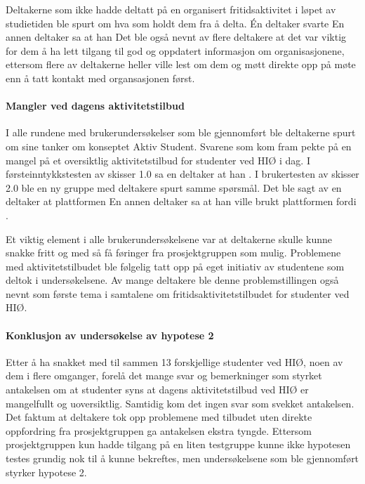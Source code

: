 Deltakerne som ikke hadde deltatt på en organisert fritidsaktivitet i løpet av studietiden ble spurt om hva som holdt dem fra å delta. Én deltaker svarte  En annen deltaker sa at han  Det ble også nevnt av flere deltakere at det var viktig for dem å ha lett tilgang til god og oppdatert informasjon om organisasjonene, ettersom flere av deltakerne heller ville lest om dem og møtt direkte opp på møte enn å tatt kontakt med organsasjonen først.

\paragraph{Mangler ved dagens aktivitetstilbud}
I alle rundene med brukerundersøkelser som ble gjennomført ble deltakerne spurt om sine tanker om konseptet Aktiv Student. Svarene som kom fram pekte på en mangel på et oversiktlig aktivitetstilbud for studenter ved HIØ i dag. I førsteinntykkstesten av skisser 1.0 sa en deltaker at han . I brukertesten av skisser 2.0 ble en ny gruppe med deltakere spurt samme spørsmål. Det ble sagt av en deltaker at plattformen  En annen deltaker sa at han ville brukt plattformen fordi .

Et viktig element i alle brukerundersøkelsene var at deltakerne skulle kunne snakke fritt og med så få føringer fra prosjektgruppen som mulig. Problemene med aktivitetstilbudet ble følgelig tatt opp på eget initiativ av studentene som deltok i undersøkelsene. Av mange deltakere ble denne problemstillingen også nevnt som første tema i samtalene om fritidsaktivitetstilbudet for studenter ved HIØ.

\paragraph{Konklusjon av undersøkelse av hypotese 2}
Etter å ha snakket med til sammen 13 forskjellige studenter ved HIØ, noen av dem i flere omganger, forelå det mange svar og bemerkninger som styrket antakelsen om at studenter syns at dagens aktivitetstilbud ved HIØ er mangelfullt og uoversiktlig. Samtidig kom det ingen svar som svekket antakelsen. Det faktum at deltakere tok opp problemene med tilbudet uten direkte oppfordring fra prosjektgruppen ga antakelsen ekstra tyngde. Ettersom prosjektgruppen kun hadde tilgang på en liten testgruppe kunne ikke hypotesen testes grundig nok til å kunne bekreftes, men undersøkelsene som ble gjennomført styrker hypotese 2.

